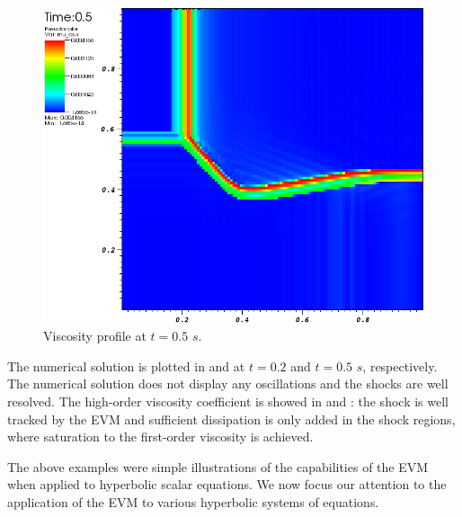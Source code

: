 \begin{figure}[H]
	\centering
	\includegraphics[width=\textwidth]{figures/Burger2D_visc_t0p5.png}
	\caption{Viscosity profile at $t=0.5$ $s$.}
	\label{fig:2d_burger_visc_t0p5}
\end{figure}
%
The numerical solution is plotted in  and  at $t=0.2$ and $t=0.5$ $s$, respectively. The numerical solution does not display any oscillations and the shocks are well resolved. The high-order viscosity coefficient is showed in  and : the shock is well tracked by the EVM and sufficient dissipation is only added in the shock regions, where saturation to the first-order viscosity is achieved.

The above examples were simple illustrations of the capabilities of the EVM when applied to hyperbolic scalar equations. We now focus our attention to the application of the EVM to various hyperbolic systems of equations.